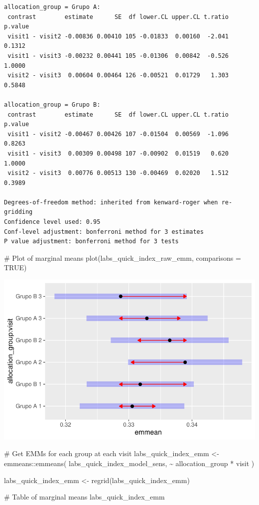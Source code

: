 \documentclass[
  letterpaper,
  DIV=11,
  numbers=noendperiod]{scrartcl}
\newenvironment{Shaded}{\begin{snugshade}}{\end{snugshade}}
\newcommand{\AttributeTok}[1]{\textcolor[rgb]{0.40,0.45,0.13}{#1}}
\newcommand{\CommentTok}[1]{\textcolor[rgb]{0.37,0.37,0.37}{#1}}
\newcommand{\ConstantTok}[1]{\textcolor[rgb]{0.56,0.35,0.01}{#1}}
\newcommand{\FunctionTok}[1]{\textcolor[rgb]{0.28,0.35,0.67}{#1}}
\newcommand{\NormalTok}[1]{\textcolor[rgb]{0.00,0.23,0.31}{#1}}
\newcommand{\OtherTok}[1]{\textcolor[rgb]{0.00,0.23,0.31}{#1}}
\newcommand{\SpecialCharTok}[1]{\textcolor[rgb]{0.37,0.37,0.37}{#1}}
\begin{document}
\begin{verbatim}
allocation_group = Grupo A:
 contrast        estimate      SE  df lower.CL upper.CL t.ratio p.value
 visit1 - visit2 -0.00836 0.00410 105 -0.01833  0.00160  -2.041  0.1312
 visit1 - visit3 -0.00232 0.00441 105 -0.01306  0.00842  -0.526  1.0000
 visit2 - visit3  0.00604 0.00464 126 -0.00521  0.01729   1.303  0.5848

allocation_group = Grupo B:
 contrast        estimate      SE  df lower.CL upper.CL t.ratio p.value
 visit1 - visit2 -0.00467 0.00426 107 -0.01504  0.00569  -1.096  0.8263
 visit1 - visit3  0.00309 0.00498 107 -0.00902  0.01519   0.620  1.0000
 visit2 - visit3  0.00776 0.00513 130 -0.00469  0.02020   1.512  0.3989

Degrees-of-freedom method: inherited from kenward-roger when re-gridding 
Confidence level used: 0.95 
Conf-level adjustment: bonferroni method for 3 estimates 
P value adjustment: bonferroni method for 3 tests 
\end{verbatim}

\begin{Shaded}
\begin{Highlighting}[]
\CommentTok{\# Plot of marginal means}
\FunctionTok{plot}\NormalTok{(labs\_quick\_index\_raw\_emm, }\AttributeTok{comparisons =} \ConstantTok{TRUE}\NormalTok{)}
\end{Highlighting}
\end{Shaded}

\includegraphics{Outcomes_V1V2V3_files/figure-pdf/labs_quick_index_raw_emm-1.pdf}

\begin{Shaded}
\begin{Highlighting}[]
\CommentTok{\# Get EMMs for each group at each visit}
\NormalTok{labs\_quick\_index\_emm }\OtherTok{\textless{}{-}}\NormalTok{ emmeans}\SpecialCharTok{::}\FunctionTok{emmeans}\NormalTok{(}
\NormalTok{    labs\_quick\_index\_model\_sens, }
    \SpecialCharTok{\textasciitilde{}}\NormalTok{ allocation\_group }\SpecialCharTok{*}\NormalTok{ visit}
\NormalTok{)}

\NormalTok{labs\_quick\_index\_emm }\OtherTok{\textless{}{-}} \FunctionTok{regrid}\NormalTok{(labs\_quick\_index\_emm)}

\CommentTok{\# Table of marginal means}
\NormalTok{labs\_quick\_index\_emm}
\end{Highlighting}
\end{Shaded}
\end{document}
